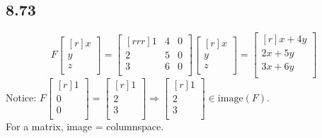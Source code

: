 \documentclass{report}
\begin{document}
\subsection{8.73}
\[ F\begin{bmatrix}[r]x\\y\\z\\\end{bmatrix} = \begin{bmatrix}[rrr]1&4&0\\2&5&0\\3&6&0\\\end{bmatrix}\begin{bmatrix}[r]x\\y\\z\\\end{bmatrix} = \begin{bmatrix}[r]x+4y\\2x+5y\\3x+6y\\\end{bmatrix} \]
Notice: $F\begin{bmatrix}[r]1\\0\\0\\\end{bmatrix}=\begin{bmatrix}[r]1\\2\\3\\\end{bmatrix} \Rightarrow \begin{bmatrix}[r]1\\2\\3\\\end{bmatrix} \in \mathrm{image}(F)$.\\
For a matrix, image = columnspace.
\end{document}
